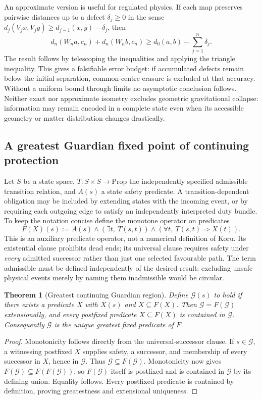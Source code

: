 \documentclass[11pt,a4paper]{article}
\newtheorem{theorem}{Theorem}[section]\newtheorem{proposition}[theorem]{Proposition}\newtheorem{definition}[theorem]{Definition}\newtheorem{example}[theorem]{Example}
\begin{document}
An approximate version is useful for regulated physics. If each map preserves pairwise distances up to a defect $\delta_j\geq0$ in the sense $d_j(V_j x,V_j y)\geq d_{j-1}(x,y)-\delta_j$, then
\[
 d_n(W_na,c_n)+d_n(W_nb,c_n)\geq d_0(a,b)-\sum_{j=1}^n\delta_j.
\]
The result follows by telescoping the inequalities and applying the triangle inequality. This gives a falsifiable error budget: if accumulated defects remain below the initial separation, common-centre erasure is excluded at that accuracy. Without a uniform bound through limits no asymptotic conclusion follows. Neither exact nor approximate isometry excludes geometric gravitational collapse: information may remain encoded in a complete state even when its accessible geometry or matter distribution changes drastically.

\subsection{A greatest Guardian fixed point of continuing protection}
Let $S$ be a state space, $T:S\times S\to\mathrm{Prop}$ the independently specified admissible transition relation, and $A(s)$ a state safety predicate. A transition-dependent obligation may be included by extending states with the incoming event, or by requiring each outgoing edge to satisfy an independently interpreted duty bundle. To keep the notation concise define the monotone operator on predicates
\[
 F(X)(s):=A(s)\land (\exists t,\ T(s,t))\land
       (\forall t,\ T(s,t)\Rightarrow X(t)).
\]
This is an auxiliary predicate operator, not a numerical definition of Koru. Its existential clause prohibits dead ends; its universal clause requires safety under \emph{every} admitted successor rather than just one selected favourable path. The term admissible must be defined independently of the desired result: excluding unsafe physical events merely by naming them inadmissible would be circular.
\begin{theorem}[Greatest continuing Guardian region]\label{thm:greatestguardian}
Define $\mathcal G(s)$ to hold if there exists a predicate $X$ with $X(s)$ and $X\subseteq F(X)$. Then $\mathcal G=F(\mathcal G)$ extensionally, and every postfixed predicate $X\subseteq F(X)$ is contained in $\mathcal G$. Consequently $\mathcal G$ is the unique greatest fixed predicate of $F$.
\end{theorem}
\begin{proof} Monotonicity follows directly from the universal-successor clause. If $s\in\mathcal G$, a witnessing postfixed $X$ supplies safety, a successor, and membership of every successor in $X$, hence in $\mathcal G$. Thus $\mathcal G\subseteq F(\mathcal G)$. Monotonicity now gives $F(\mathcal G)\subseteq F(F(\mathcal G))$, so $F(\mathcal G)$ itself is postfixed and is contained in $\mathcal G$ by its defining union. Equality follows. Every postfixed predicate is contained by definition, proving greatestness and extensional uniqueness.\end{proof}
\end{document}

